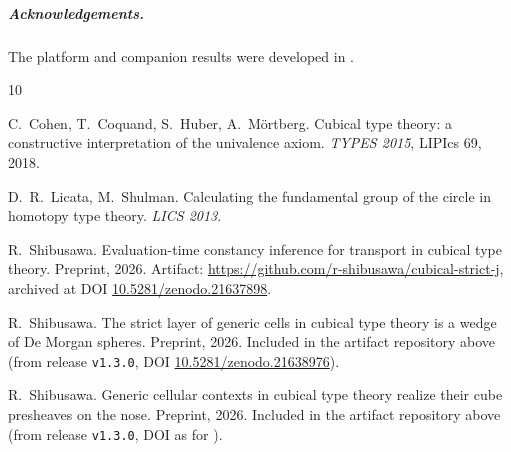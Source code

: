 \documentclass[11pt]{amsart}
\theoremstyle{definition}
\begin{document}
\subparagraph*{Acknowledgements.}  The platform and companion
results were developed in \cite{Const,Sphere,Realization}.

\begin{thebibliography}{10}

C.~Cohen, T.~Coquand, S.~Huber, A.~M\"ortberg.
\newblock Cubical type theory: a constructive interpretation of the
  univalence axiom.
\newblock \emph{TYPES 2015}, LIPIcs 69, 2018.

D.~R.~Licata, M.~Shulman.
\newblock Calculating the fundamental group of the circle in
  homotopy type theory.
\newblock \emph{LICS 2013}.

R.~Shibusawa.
\newblock Evaluation-time constancy inference for transport in
  cubical type theory.
\newblock Preprint, 2026.  Artifact:
  \url{https://github.com/r-shibusawa/cubical-strict-j}, archived
  at DOI \href{https://doi.org/10.5281/zenodo.21637898}%
  {10.5281/zenodo.21637898}.

R.~Shibusawa.
\newblock The strict layer of generic cells in cubical type theory
  is a wedge of De Morgan spheres.
\newblock Preprint, 2026.  Included in the artifact repository
  above (from release \texttt{v1.3.0}, DOI
  \href{https://doi.org/10.5281/zenodo.21638976}%
  {10.5281/zenodo.21638976}).

R.~Shibusawa.
\newblock Generic cellular contexts in cubical type theory realize
  their cube presheaves on the nose.
\newblock Preprint, 2026.  Included in the artifact repository
  above (from release \texttt{v1.3.0}, DOI as for \cite{Sphere}).

\end{thebibliography}
\end{document}
